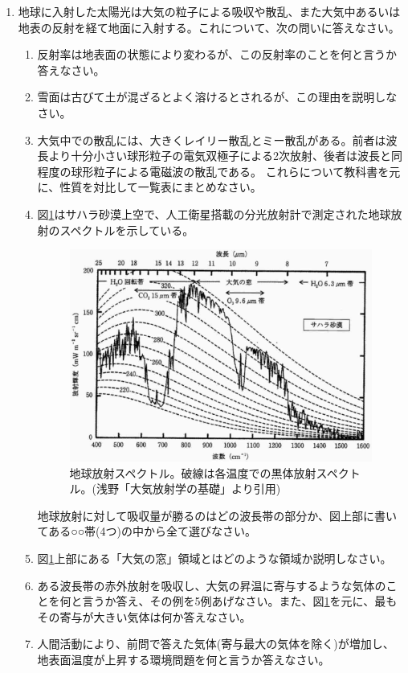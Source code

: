 \documentclass{jsarticle}
\newenvironment{problems}
{
  \renewcommand\labelenumi{\doublebox{\arabic{enumi}}}
  \begin{enumerate}
}{
  \end{enumerate}
  \renewcommand\labelenumi{\arabic{enumi}.}
}
\begin{document}
\begin{problems}
        \begin{enumerate}[(1)]
        \item 文中の空欄(A)〜(C)に当てはまる語句や数値を答えなさい。
        \item 下線部(a)のように、地域別あるいは季節別に収支バランスが成り立たない理由を述べなさい。
        \item アルベドの緯度分布は必ずしも南北対称とは言えない。対称でない理由を述べなさい。\\
        \end{enumerate}

    \item 地球に入射した太陽光は大気の粒子による吸収や散乱、また大気中あるいは地表の反射を経て地面に入射する。これについて、次の問いに答えなさい。
        \begin{enumerate}[(1)]
        \item 反射率は地表面の状態により変わるが、この反射率のことを何と言うか答えなさい。
        \item 雪面は古びて土が混ざるとよく溶けるとされるが、この理由を説明しなさい。
        \item 大気中での散乱には、大きくレイリー散乱とミー散乱がある。前者は波長より十分小さい球形粒子の電気双極子による2次放射、後者は波長と同程度の球形粒子による電磁波の散乱である。
              これらについて教科書を元に、性質を対比して一覧表にまとめなさい。
        \item 図\ref{Sahara}はサハラ砂漠上空で、人工衛星搭載の分光放射計で測定された地球放射のスペクトルを示している。
        \begin{figure}[h]
        \centering
        \includegraphics[width=0.6\linewidth,keepaspectratio]{Sahara.eps}
        \caption{地球放射スペクトル。破線は各温度での黒体放射スペクトル。(浅野「大気放射学の基礎」より引用)}\label{Sahara}
        \end{figure}
              地球放射に対して吸収量が勝るのはどの波長帯の部分か、図上部に書いてある○○帯(4つ)の中から全て選びなさい。
        \item 図\ref{Sahara}上部にある「大気の窓」領域とはどのような領域か説明しなさい。
        \item ある波長帯の赤外放射を吸収し、大気の昇温に寄与するような気体のことを何と言うか答え、その例を5例あげなさい。また、図\ref{Sahara}を元に、最もその寄与が大きい気体は何か答えなさい。
        \item 人間活動により、前問で答えた気体(寄与最大の気体を除く)が増加し、地表面温度が上昇する環境問題を何と言うか答えなさい。\\
        \end{enumerate}


\end{problems}
\end{document}
